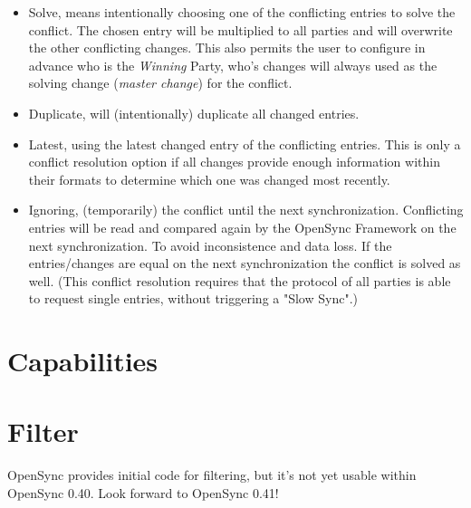 \begin{itemize}
\item Solve, means intentionally choosing one of the conflicting entries to
solve the conflict. The chosen entry will be multiplied to all parties and will
overwrite the other conflicting changes. This also permits the user to configure in
advance who is the \emph{Winning} Party, who's changes will always used as the 
solving change (\emph{master change}) for the conflict.
\item Duplicate, will (intentionally) duplicate all changed entries. 
\item Latest, using the latest changed entry of the conflicting entries. This is
only a conflict resolution option if all changes provide enough information within
their formats to determine which one was changed most recently.
\item Ignoring, (temporarily) the conflict until the next synchronization.
Conflicting entries will be read and compared again by the OpenSync Framework on
the next synchronization. To avoid inconsistence and data loss. If the
entries/changes are equal on the next synchronization the conflict is solved as
well. (This conflict resolution requires that the protocol of all parties is
able to request single entries, without triggering a "Slow Sync".)
\end{itemize}
\section{Capabilities}
\section{Filter}
OpenSync provides initial code for filtering, but it's not yet usable within
OpenSync 0.40. Look forward to OpenSync 0.41!
